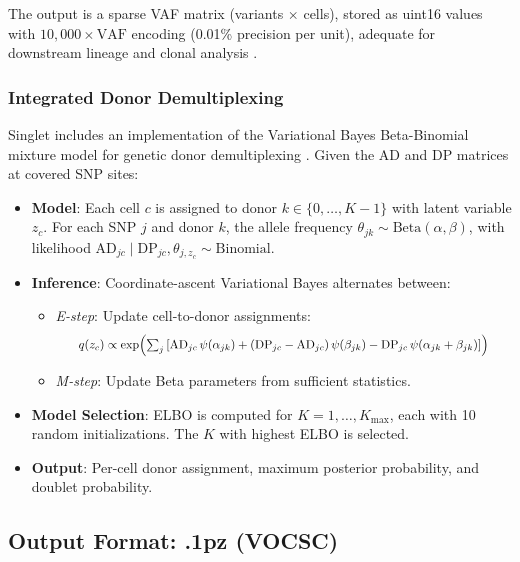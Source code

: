 \documentclass[11pt,a4paper]{article}
\begin{document}
The output is a sparse VAF matrix (variants $\times$ cells), stored as uint16 values with $10{,}000 \times \text{VAF}$ encoding (0.01\% precision per unit), adequate for downstream lineage and clonal analysis \citep{ludwig2019lineage}.

\subsubsection{Integrated Donor Demultiplexing}

Singlet includes an implementation of the Variational Bayes Beta-Binomial mixture model for genetic donor demultiplexing \citep{huang2019vireo}. Given the AD and DP matrices at covered SNP sites:

\begin{itemize}
    \item \textbf{Model}: Each cell $c$ is assigned to donor $k \in \{0, \ldots, K-1\}$ with latent variable $z_c$. For each SNP $j$ and donor $k$, the allele frequency $\theta_{jk} \sim \text{Beta}(\alpha, \beta)$, with likelihood $\text{AD}_{jc} \mid \text{DP}_{jc}, \theta_{j,z_c} \sim \text{Binomial}$.
    
    \item \textbf{Inference}: Coordinate-ascent Variational Bayes alternates between:
    \begin{itemize}
        \item \textit{E-step}: Update cell-to-donor assignments:
        \begin{equation*}
        \resizebox{0.85\linewidth}{!}{$q(z_c) \propto \exp\!\left(\sum_j \left[\text{AD}_{jc}\, \psi(\alpha_{jk}) + (\text{DP}_{jc} - \text{AD}_{jc})\, \psi(\beta_{jk}) - \text{DP}_{jc}\, \psi(\alpha_{jk} + \beta_{jk})\right]\right)$}
        \end{equation*}
        \item \textit{M-step}: Update Beta parameters from sufficient statistics.
    \end{itemize}
    
    \item \textbf{Model Selection}: ELBO is computed for $K = 1, \ldots, K_\text{max}$, each with 10 random initializations. The $K$ with highest ELBO is selected.
    
    \item \textbf{Output}: Per-cell donor assignment, maximum posterior probability, and doublet probability.
\end{itemize}

\subsection{Output Format: .1pz (VOCSC)}
\end{document}
